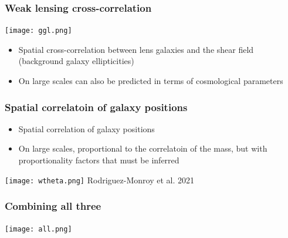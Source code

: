 \documentclass{beamer}
\begin{document}
\frame
{
    \frametitle{Weak lensing cross-correlation}


    \begin{center}
        \texttt{[image: ggl.png]}
    \end{center}

    \begin{itemize}

        \item Spatial cross-correlation between lens galaxies and
            the shear field (background galaxy ellipticities)

        \item On large scales can also be predicted in terms of cosmological
            parameters

    \end{itemize}

}

\frame
{
    \frametitle{Spatial correlatoin of galaxy positions}


    \begin{itemize}

        \item Spatial correlation of galaxy positions 

        \item On large scales, proportional to the correlatoin of the
            mass, but with proportionality factors that must be inferred

    \end{itemize}
    \begin{center}
        \texttt{[image: wtheta.png]}
        {\tiny Rodriguez-Monroy et al. 2021}
    \end{center}

}

\frame
{
    \frametitle{Combining all three}

    \begin{center}
        \texttt{[image: all.png]}
    \end{center}

}
\end{document}
